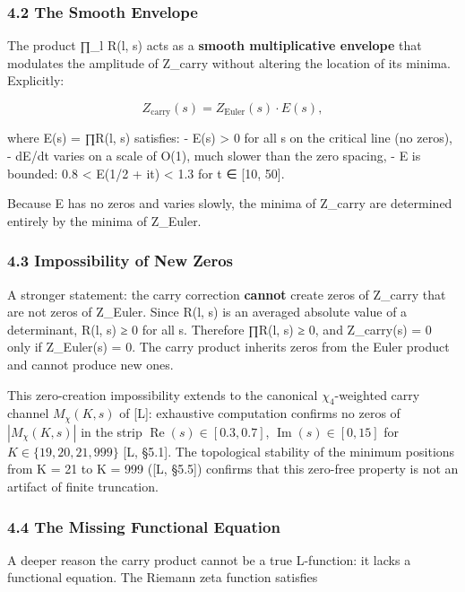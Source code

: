\documentclass[
  11pt,
]{article}
\begin{document}
\subsubsection{4.2 The Smooth Envelope}\label{the-smooth-envelope}

The product ∏\_l R(l, s) acts as a \textbf{smooth multiplicative envelope} that
modulates the amplitude of Z\_carry without altering the location of its minima.
Explicitly:

\[Z_{\text{carry}}(s) = Z_{\text{Euler}}(s) \cdot E(s),\]

where E(s) = ∏R(l, s) satisfies: - E(s) \textgreater{} 0 for all s on the
critical line (no zeros), - dE/dt varies on a scale of O(1), much slower than
the zero spacing, - E is bounded: 0.8 \textless{} E(1/2 + it) \textless{} 1.3
for t ∈ {[}10, 50{]}.

Because E has no zeros and varies slowly, the minima of Z\_carry are determined
entirely by the minima of Z\_Euler.

\subsubsection{4.3 Impossibility of New Zeros}\label{impossibility-of-new-zeros}

A stronger statement: the carry correction \textbf{cannot} create zeros of
Z\_carry that are not zeros of Z\_Euler. Since R(l, s) is an averaged absolute
value of a determinant, R(l, s) ≥ 0 for all s. Therefore ∏R(l, s) ≥ 0, and
Z\_carry(s) = 0 only if Z\_Euler(s) = 0. The carry product inherits zeros from
the Euler product and cannot produce new ones.

This zero-creation impossibility extends to the canonical \(\chi_4\)-weighted
carry channel \(M_{\chi}(K, s)\) of {[}L{]}: exhaustive computation confirms no
zeros of \(|M_{\chi}(K, s)|\) in the strip
\(\operatorname{Re}(s) \in [0.3, 0.7]\), \(\operatorname{Im}(s) \in [0, 15]\)
for \(K \in \{19, 20, 21, 999\}\) {[}L, §5.1{]}. The topological stability of
the minimum positions from K = 21 to K = 999 ({[}L, §5.5{]}) confirms that this
zero-free property is not an artifact of finite truncation.

\subsubsection{4.4 The Missing Functional
Equation}\label{the-missing-functional-equation}

A deeper reason the carry product cannot be a true L-function: it lacks a
functional equation. The Riemann zeta function satisfies
\end{document}
